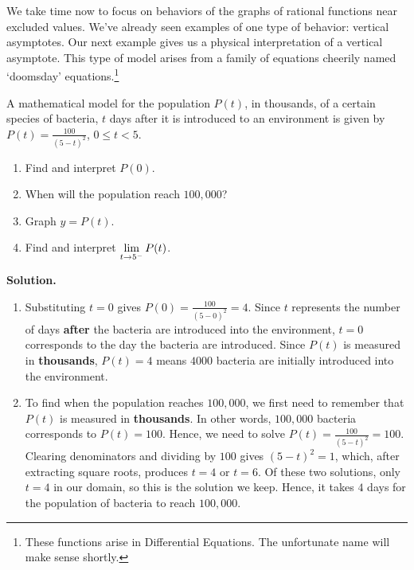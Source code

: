 We take time now to focus on behaviors of the graphs of rational functions near excluded values.  We've already seen examples of one type of behavior:  vertical asymptotes.  Our next example gives us a physical interpretation of a vertical asymptote.  This type of model arises from a family of equations cheerily named `doomsday' equations.\footnote{These functions arise in Differential Equations.  The unfortunate name will make sense shortly.}  

\begin{ex}  \label{doomsdaypopex} A mathematical model for the population $P(t)$, in thousands, of a certain species of bacteria, $t$ days after it is introduced to an environment is given by $P(t) = \frac{100}{(5-t)^{2}}$, $0 \leq t < 5$.


\begin{enumerate}

\item  Find and interpret $P(0)$.

\item  When will the population reach $100,\!000$?

\item  Graph $y = P(t)$.  

\item  Find and interpret $\ds{\lim_{t \rightarrow 5^{-}} P(t)}$.

\end{enumerate}

{ \bf Solution.}  

\begin{enumerate}

\item  Substituting $t=0$ gives $P(0) = \frac{100}{(5-0)^2} = 4$.  Since $t$ represents the number of days \textbf{after} the bacteria are introduced into the environment, $t =0$ corresponds to the day the bacteria are introduced.  Since $P(t)$ is measured in \textbf{thousands}, $P(t) = 4$  means $4000$ bacteria are initially introduced into the environment.

\item  To find when the population reaches $100,\! 000$, we first need to remember that $P(t)$ is measured in \textbf{thousands}.  In other words, $100,\! 000$ bacteria corresponds to $P(t) = 100$.  Hence, we need to solve  $P(t) = \frac{100}{(5-t)^2} = 100$.  Clearing denominators and dividing by $100$ gives $(5-t)^2=1$, which, after extracting square roots, produces $t = 4$ or $t=6$.  Of these two solutions, only $t=4$ in our domain, so this is the solution we keep.  Hence, it takes $4$ days for the population of bacteria to reach $100,\! 000$.


\end{enumerate}
\end{ex}
